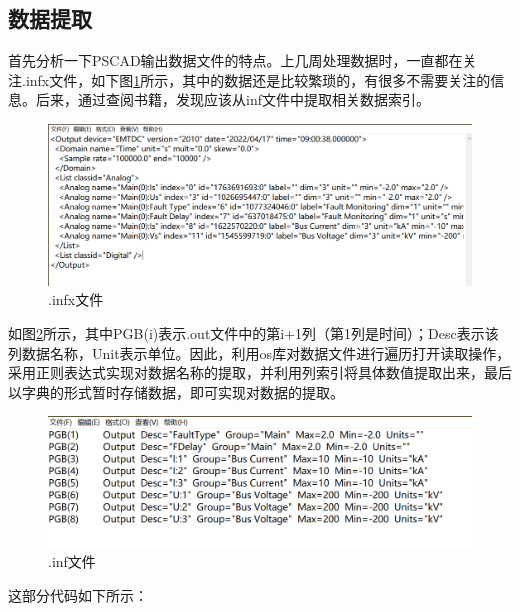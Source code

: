 \documentclass{article}
\begin{document}
	\subsection{数据提取}
	
	首先分析一下PSCAD输出数据文件的特点。上几周处理数据时，一直都在关注.infx文件，如下图\ref{fig:infx}所示，其中的数据还是比较繁琐的，有很多不需要关注的信息。后来，通过查阅书籍，发现应该从inf文件中提取相关数据索引。

	\begin{figure}[h]
		\centering
		\includegraphics[width=15cm]{figure/infx.png}
		\caption{.infx文件}
		\label{fig:infx}
	\end{figure}

	如图\ref{fig:inf}所示，其中PGB(i)表示.out文件中的第i+1列（第1列是时间）；Desc表示该列数据名称，Unit表示单位。因此，利用os库对数据文件进行遍历打开读取操作，采用正则表达式实现对数据名称的提取，并利用列索引将具体数值提取出来，最后以字典的形式暂时存储数据，即可实现对数据的提取。
	
	\begin{figure}[h]
		\centering
		\includegraphics[width=15cm]{figure/inf.png}
		\caption{.inf文件}
		\label{fig:inf}
	\end{figure}

	这部分代码如下所示：
	
\end{document}
